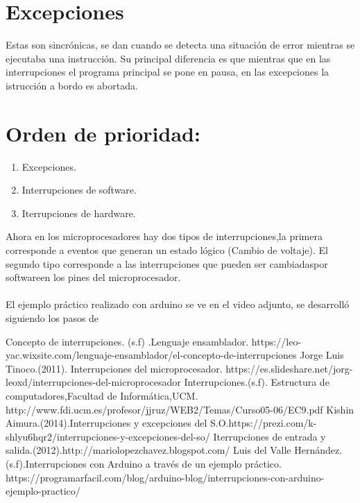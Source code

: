 \documentclass{report}   %
\begin{document}
\section*{Excepciones}
Estas son sincrónicas, se dan cuando se detecta una situación de error mientras se ejecutaba una instrucción.
Su principal diferencia es que mientras que en las interrupciones el programa principal se pone en pausa, en las excepciones la istrucción a bordo es abortada.
\section*{Orden de prioridad:}
\begin{enumerate}
    \item Excepciones.
    \item Interrupciones de software.
    \item Iterrupciones de hardware.
\end{enumerate}
Ahora en los microprocesadores hay dos tipos de interrupciones,la primera corresponde a eventos que generan un estado lógico (Cambio de voltaje). El segundo tipo corresponde a las interrupciones que pueden ser cambiadaspor softwareen los pines del microprocesador.\\\\


El ejemplo práctico realizado con arduino se ve en el video adjunto, se desarrolló siguiendo los pasos de \cite{6}

\begin{thebibliography}{0}
  Concepto de interrupciones. (s.f) .Lenguaje ensamblador.
  https://leo-yac.wixsite.com/lenguaje-ensamblador/el-concepto-de-interrupciones
   Jorge Luis Tinoco.(2011). Interrupciones del microprocesador. https://es.slideshare.net/jorg-leoxd/interrupciones-del-microprocesador
   Interrupciones.(s.f). Estructura de computadores,Facultad de Informática,UCM. http://www.fdi.ucm.es/profesor/jjruz/WEB2/Temas/Curso05-06/EC9.pdf
  Kishin Aimura.(2014).Interrupciones y excepciones del S.O.https://prezi.com/k-shlyu6hqr2/interrupciones-y-excepciones-del-so/ Iterrupciones de entrada y salida.(2012).http://mariolopezchavez.blogspot.com/
   Luis del Valle Hernández.(s.f).Interrupciones con Arduino a través de un ejemplo práctico. https://programarfacil.com/blog/arduino-blog/interrupciones-con-arduino-ejemplo-practico/
\end{thebibliography}
\end{document}

